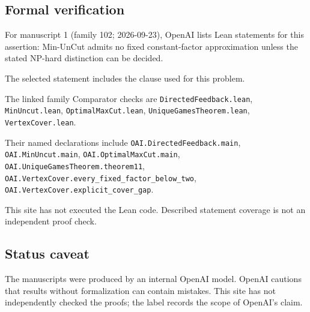\documentclass[11pt]{article}
\begin{document}
\subsection{Formal verification}
For manuscript 1 (family 102; 2026-09-23), OpenAI lists Lean statements for this assertion: Min-UnCut admits no fixed constant-factor approximation unless the stated NP-hard distinction can be decided.

The selected statement includes the clause used for this problem.

The linked family Comparator checks are \texttt{DirectedFeedback.lean}, \texttt{MinUncut.lean}, \texttt{OptimalMaxCut.lean}, \texttt{UniqueGamesTheorem.lean}, \texttt{VertexCover.lean}.

Their named declarations include \texttt{OAI.DirectedFeedback.main}, \texttt{OAI.MinUncut.main}, \texttt{OAI.OptimalMaxCut.main}, \texttt{OAI.UniqueGamesTheorem.theorem11}, \texttt{OAI.VertexCover.every\_fixed\_factor\_below\_two}, \texttt{OAI.VertexCover.explicit\_cover\_gap}.

This site has not executed the Lean code. Described statement coverage is not an independent proof check.

\subsection{Status caveat}
The manuscripts were produced by an internal OpenAI model. OpenAI cautions that results without formalization can contain mistakes. This site has not independently checked the proofs; the label records the scope of OpenAI's claim.
\end{document}
